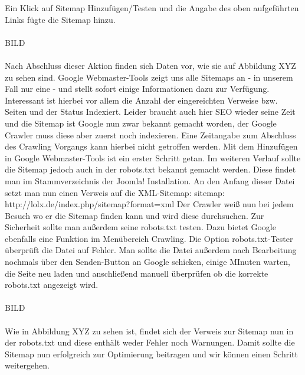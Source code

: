 Ein Klick auf Sitemap Hinzufügen/Testen und die Angabe des oben aufgeführten Links fügte die Sitemap hinzu.
\\ \\ BILD \\ \\
Nach Abschluss dieser Aktion finden sich Daten vor, wie sie auf Abbildung XYZ zu sehen sind. Google Webmaster-Tools zeigt uns alle Sitemaps an - in unserem Fall nur eine - und stellt sofort einige Informationen dazu zur Verfügung. Interessant ist hierbei vor allem die Anzahl der eingereichten Verweise bzw. Seiten und der Status Indexiert. Leider braucht auch hier SEO wieder seine Zeit und die Sitemap ist Google nun zwar bekannt gemacht worden, der Google Crawler muss diese aber zuerst noch indexieren. Eine Zeitangabe zum Abschluss des Crawling Vorgangs kann hierbei nicht getroffen werden.
Mit dem Hinzufügen in Google Webmaster-Tools ist ein erster Schritt getan. Im weiteren Verlauf sollte die Sitemap jedoch auch in der robots.txt bekannt gemacht werden. Diese findet man im Stammverzeichnis der Joomla! Installation. An den Anfang dieser Datei setzt man nun einen Verweis auf die XML-Sitemap:
sitemap: http://lolx.de/index.php/sitemap?format=xml
Der Crawler weiß nun bei jedem Besuch wo er die Sitemap finden kann und wird diese  durchsuchen. Zur Sicherheit sollte man außerdem seine robots.txt testen. Dazu bietet Google ebenfalls eine Funktion im Menübereich Crawling. Die Option robots.txt-Tester überprüft die Datei auf Fehler. Man sollte die Datei außerdem nach Bearbeitung nochmals über den Senden-Button an Google schicken, einige MInuten warten, die Seite neu laden und anschließend manuell überprüfen ob die korrekte robots.txt angezeigt wird.
\\ \\ BILD \\ \\
Wie in Abbildung XYZ zu sehen ist, findet sich der Verweis zur Sitemap nun in der robots.txt und diese enthält weder Fehler noch Warnungen. Damit sollte die Sitemap nun erfolgreich zur Optimierung beitragen und wir können einen Schritt weitergehen.


